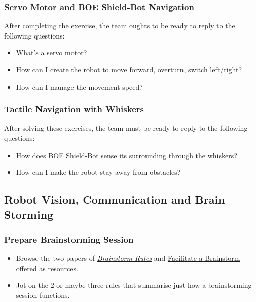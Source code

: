\documentclass{article}
\begin{document}
\subsubsection{Servo Motor and BOE Shield-Bot Navigation}
After completing the exercise, the team oughts to be ready to reply to the following questions:
\begin{itemize}
	\item What's a servo motor?
	\item How can I create the robot to move forward, overturn, switch left/right?
	\item How can I manage the movement speed?
\end{itemize} 

\subsubsection{Tactile Navigation with Whiskers}
After solving these exercises, the team must be ready to reply to the following questions:
\begin{itemize}
	\item How does BOE Shield-Bot sense its surrounding through the whiskers?
	\item How can I make the robot stay away from obstacles?
\end{itemize} 

\subsection{Robot Vision, Communication and Brain Storming}

\subsubsection{Prepare Brainstorming Session}
\begin{itemize}
	\item Browse the two papers of \href{https://canvas.sydney.edu.au/courses/5511/files/2801346/download?wrap=1}{\textit{Brainstorm Rules}} and \href{https://canvas.sydney.edu.au/courses/5511/files/2801350/download?wrap=1}{Facilitate a Brainstorm} offered as resources.
	\item Jot on the 2 or maybe three rules that summarise just how a brainstorming session functions.
\end{itemize} 
\end{document}

